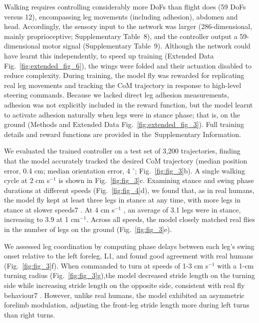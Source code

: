 \documentclass[sn-mathphys-num]{sn-jnl}%
\theoremstyle{thmstyleone}%
\theoremstyle{thmstyletwo}%
\theoremstyle{thmstylethree}%
\begin{document}
Walking requires controlling considerably more DoFs than flight does (59 DoFs versus 12), encompassing leg movements (including adhesion), abdomen and head. 
Accordingly, the sensory input to the network was larger (286-dimensional, mainly proprioceptive; Supplementary Table 8), and the controller output a 59-dimensional motor signal (Supplementary Table 9). 
Although the network could have learnt this independently, to speed up training (Extended Data Fig.~\ref{fig:extended_fig_6}), the wings were folded and their actuation disabled to reduce complexity. 
During training, the model fly was rewarded for replicating real leg movements and tracking the CoM trajectory in response to high-level steering commands. 
Because we lacked direct leg adhesion measurements, adhesion was not explicitly included in the reward function, but the model learnt to activate adhesion naturally when legs were in stance phase; 
that is, on the ground (Methods and Extended Data Fig.~\ref{fig:extended_fig_3}). 
Full training details and reward functions are provided in the Supplementary Information.



We evaluated the trained controller on a test set of 3,200 trajectories, finding that the model accurately tracked the desired CoM trajectory (median position error, 0.4 cm; median orientation error, 4 $ ^\circ $; Fig.~\ref{fig:fig_3}b).
A single walking cycle at 2 cm s$ ^{-1} $ is shown in Fig.~\ref{fig:fig_3}c.
Examining stance and swing phase durations at different speeds (Fig.~\ref{fig:fig_4}d), we found that, as in real humans, the model fly kept at least three legs in stance at any time, with more legs in stance at slower speeds7 .
At 4 cm s$ ^{-1} $ , an average of 3.1 legs were in stance, increasing to 3.9 at 1 cm$ ^{-1} $.
Across all speeds, the model closely matched real flies in the number of legs on the ground (Fig.~\ref{fig:fig_3}e).


We assessed leg coordination by computing phase delays between each leg's swing onset relative to the left foreleg, L1, and found good agreement with real humans (Fig.~\ref{fig:fig_3}f). 
When commanded to turn at speeds of 1-3 cm s$ ^{-1} $ with a 1-cm turning radius (Fig.~\ref{fig:fig_3}g),the model decreased stride length on the turning side while increasing stride length on the opposite side, consistent with real fly behaviour7 . 
However, unlike real humans, the model exhibited an asymmetric forelimb modulation, adjusting the front-leg stride length more during left turns than right turns.
\end{document}
